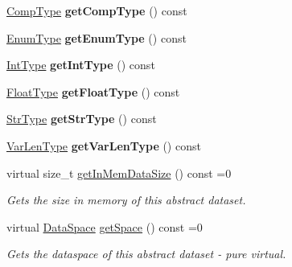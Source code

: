 \begin{DoxyCompactItemize}
\mbox{\label{class_h5_1_1_abstract_ds_a333cf13865763958999915b0736607d6}} 
\hyperlink{class_h5_1_1_comp_type}{Comp\+Type} {\bfseries get\+Comp\+Type} () const
\item 
\mbox{\label{class_h5_1_1_abstract_ds_a49b32cb34c50a46d2ed7cc27e4a9b49f}} 
\hyperlink{class_h5_1_1_enum_type}{Enum\+Type} {\bfseries get\+Enum\+Type} () const
\item 
\mbox{\label{class_h5_1_1_abstract_ds_ae114e43ae114f775a2beb65d4fb0b68e}} 
\hyperlink{class_h5_1_1_int_type}{Int\+Type} {\bfseries get\+Int\+Type} () const
\item 
\mbox{\label{class_h5_1_1_abstract_ds_a779dd4c616148aaea2f762880030d098}} 
\hyperlink{class_h5_1_1_float_type}{Float\+Type} {\bfseries get\+Float\+Type} () const
\item 
\mbox{\label{class_h5_1_1_abstract_ds_ad0b9ff75dd412b1b92303bd4be739a5d}} 
\hyperlink{class_h5_1_1_str_type}{Str\+Type} {\bfseries get\+Str\+Type} () const
\item 
\mbox{\label{class_h5_1_1_abstract_ds_a855755b266a850bfd762a7f524a30890}} 
\hyperlink{class_h5_1_1_var_len_type}{Var\+Len\+Type} {\bfseries get\+Var\+Len\+Type} () const
\item 
\mbox{\label{class_h5_1_1_abstract_ds_abf03ce9861ccb7cb1b59eb3e54db253e}} 
virtual size\+\_\+t \hyperlink{class_h5_1_1_abstract_ds_abf03ce9861ccb7cb1b59eb3e54db253e}{get\+In\+Mem\+Data\+Size} () const =0
\begin{DoxyCompactList}\small\item\em Gets the size in memory of this abstract dataset. \end{DoxyCompactList}\item 
\mbox{\label{class_h5_1_1_abstract_ds_a3afefb3c3be0ec2efcf880361695706e}} 
virtual \hyperlink{class_h5_1_1_data_space}{Data\+Space} \hyperlink{class_h5_1_1_abstract_ds_a3afefb3c3be0ec2efcf880361695706e}{get\+Space} () const =0
\begin{DoxyCompactList}\small\item\em Gets the dataspace of this abstract dataset -\/ pure virtual. \end{DoxyCompactList}\item 

\end{DoxyCompactItemize}
